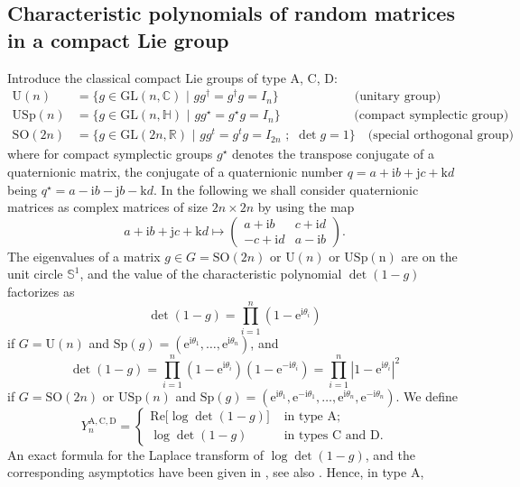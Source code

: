 \documentclass[12pt,a4paper,reqno]{amsart}
\theoremstyle{remark}
\newcommand{\R}{\mathbb{R}}
\newcommand{\C}{\mathbb{C}}
\newcommand{\E}{\mathrm{e}}
\newcommand{\I}{\mathrm{i}}
\renewcommand{\Re}{\mathrm{Re}}
\begin{document}
\subsection{Characteristic polynomials of random matrices in a compact Lie group}\label{subsec:rmtpol}
Introduce the classical compact Lie groups of type $\mathrm{A}$, $\mathrm{C}$, $\mathrm{D}$:
\begin{align*}
\mathrm{U}(n)&=\{g \in \mathrm{GL}(n,\C)\,\,|\,\,gg^{\dagger}=g^{\dagger}g=I_{n}\}\qquad\qquad\quad\,\,\,\,\,\,\text{(unitary group)}\\
\mathrm{USp}(n)&=\{g \in \mathrm{GL}(n,\mathbb{H})\,\,|\,\,gg^{\star}=g^{\star}g=I_{n}\}\qquad\qquad\quad\,\,\,\,\,\text{(compact symplectic group)}\\
\mathrm{SO}(2n)&=\{g \in \mathrm{GL}(2n,\R)\,\,|\,\,gg^{t}=g^{t}g=I_{2n} \,\,;\,\,\det g =1\}\quad\text{(special orthogonal group)}
\end{align*}
where for compact symplectic groups $g^{\star}$ denotes the transpose conjugate of a quaternionic matrix, the conjugate of a quaternionic number $q=a+\I b+\mathrm{j} c+\mathrm{k} d$ being $q^{\star}=a-\I b-\mathrm{j} b- \mathrm{k}d$. In the following we shall consider quaternionic matrices as complex matrices of size $2n \times 2n$ by using the map
$$
a+\I b+\mathrm{j} c+\mathrm{k} d \mapsto \begin{pmatrix} a+\I b & c+\I d \\ -c + \I d & a-\I b\end{pmatrix}.
$$
The eigenvalues of a matrix $g \in G=\mathrm{SO}(2n) \text{ or }\mathrm{U}(n)\text{ or }\mathrm{USp(n)}$ are on the unit circle $\mathbb{S}^{1}$, and the value of the characteristic polynomial $\det(1-g)$ factorizes as
$$\det(1-g) = \prod_{i=1}^n (1-\E^{\I \theta_i}) $$
if $G=\mathrm{U}(n)$ and $\mathrm{Sp}(g) = (\E^{\I \theta_1},\ldots,\E^{\I \theta_n})$, and
$$\det(1-g) = \prod_{i=1}^{n} (1-\E^{\I\theta_i})(1-\E^{-\I\theta_i}) = \prod_{i=1}^n |1-\E^{\I\theta_i}|^2 $$
if $G=\mathrm{SO}(2n)$ or $\mathrm{USp}(n)$ and $\mathrm{Sp}(g) = (\E^{\I \theta_1},\E^{-\I \theta_1},\ldots,\E^{\I \theta_n},\E^{-\I\theta_n})$.
We define
\[Y_{n}^{\mathrm{A},\mathrm{C},\mathrm{D}}=
\begin{cases}
    \Re \big[ \log\det(1-g) \big] & \text{ in type $\mathrm{A}$;}\\
    \log\det(1-g) & \text{ in types $\mathrm{C}$ and $\mathrm{D}$.}
\end{cases}\]
An exact formula for the Laplace transform of $\log \det(1-g)$, and the corresponding asymptotics have been given in \cite{KS2,KS1,HKO01}, see also \cite[Sections 3 and 4]{KN12}. Hence, in type A,
\end{document}
